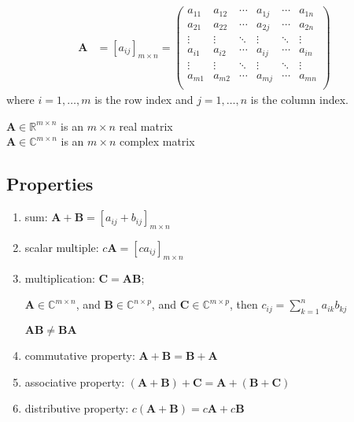 \documentclass[12pt]{article}
\newcommand{\ve}[1]{\ensuremath{\mathbf{#1}}}
\begin{document}
\begin{align}
    \ve{A} &= [a_{ij}]_{m\times n}   =    \begin{pmatrix}
      a_{11} & a_{12} & \cdots & a_{1j} & \cdots & a_{1n} \\
      a_{21} & a_{22} & \cdots & a_{2j} & \cdots & a_{2n} \\
       \vdots & \vdots & \ddots & \vdots & \ddots   & \vdots \\     
      a_{i1} & a_{i2} & \cdots & a_{ij} & \cdots & a_{in} \\
      \vdots & \vdots & \ddots & \vdots & \ddots   & \vdots \\
      a_{m1} & a_{m2} & \cdots & a_{mj} & \cdots & a_{mn} \\
    \end{pmatrix} \nonumber   
\end{align} 
%
where $i = 1, \dots, m$ is the row index and $j = 1, \dots, n$ is the column index.

$\ve{A} \in \mathbb{R}^{m \times n}$ is an $m \times n$ real matrix\\
$\ve{A} \in \mathbb{C}^{m \times n}$ is an $m \times n$ complex matrix

\subsection*{Properties}
%
\begin{enumerate}
\item sum: $\ve{A} + \ve{B} = [a_{ij} + b_{ij}]_{m \times n}$

\item scalar multiple: $c\ve{A} = [c a_{ij}]_{m \times n}$

\item multiplication: $\ve{C} = \ve{A}\ve{B}$;

$\ve{A} \in \mathbb{C}^{m \times n}$, and $\ve{B} \in \mathbb{C}^{n \times p}$, and $\ve{C} \in \mathbb{C}^{m \times p}$, then $c_{ij} = \sum_{k=1}^n a_{ik} b_{kj}$

$\ve{A}\ve{B} \neq \ve{B}\ve{A}$

\item commutative property: $\ve{A} + \ve{B} = \ve{B} + \ve{A}$

\item associative property: $(\ve{A} + \ve{B}) + \ve{C} = \ve{A} + (\ve{B} + \ve{C})$

\item distributive property: $c(\ve{A} + \ve{B}) = c\ve{A} + c\ve{B}$

\end{enumerate}
\end{document}
